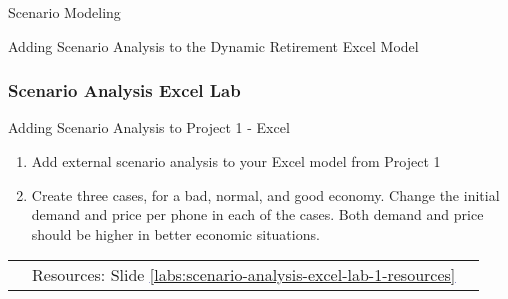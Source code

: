 \documentclass[handout, 11pt]{beamer}
\begin{document}
\begin{section}{Scenario Modeling}
\begin{frame}
{\begin{block}{Adding Scenario Analysis to the Dynamic Retirement Excel Model}
\end{block}
}
\end{frame}
\begin{frame}
\frametitle{Scenario Analysis Excel Lab}
{
\begin{block}{Adding Scenario Analysis to Project 1 - Excel}
\begin{enumerate}
\item Add external scenario analysis to your Excel model from Project 1
\item Create three cases, for a bad, normal, and good economy. Change the initial demand and price per phone in each of the cases. Both demand and price should be higher in better economic situations. 
\end{enumerate}
\vfill
\begin{tabular*}{\textwidth}{@{\extracolsep{\fill}}ccc}
\toprule
\hfill & Resources: Slide \textcolor{blue}{\underline{\ref{labs:scenario-analysis-excel-lab-1-resources}}} & \hfill\\


\end{tabular*}
\end{block}}
\end{frame}
\end{section}
\end{document}
